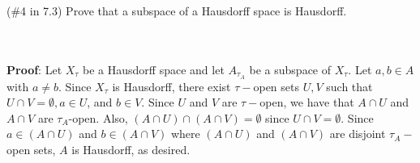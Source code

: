 (\#4 in 7.3)  Prove that a subspace of a Hausdorff space is Hausdorff.\\\\

\begin{solution}\renewcommand{\qedsymbol}{}\ \\
    \textbf{Proof}: Let $X_{\tau}$ be a Hausdorff space and let $A_{\tau_A}$ be a subspace of
    $X_{\tau}$. Let $a,b\in A$ with $a\neq b$. Since $X_{\tau}$ is Hausdorff, there exist
    $\tau-$open sets $U,V$ such that $U\cap V=\emptyset, a\in U$, and $b\in V$. Since $U$ and $V$ are
    $\tau-$open, we have that $A\cap U$ and $A\cap V$ are $\tau_A$-open. Also,
    $(A\cap U)\cap(A\cap V)=\emptyset$ since $U\cap V=\emptyset$. Since $a\in(A\cap U)$ and
    $b\in(A\cap V)$ where $(A\cap U)$ and $(A\cap V)$ are disjoint $\tau_A-$open sets, $A$ is Hausdorff,
    as desired.

\end{solution}